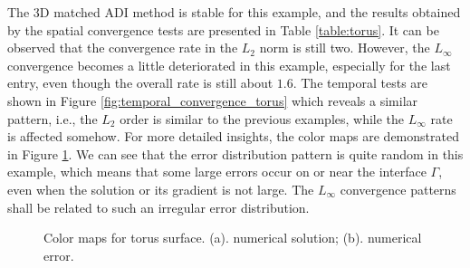 \documentclass[dissertation]{uathesis}
\begin{document}
\begin{body}
The 3D matched ADI method is stable for this example, and 
the results obtained by the spatial convergence tests are presented in Table \ref{table:torus}. It can be observed that the convergence rate in the $L_2$ norm is still two. However, the $L_{\infty}$ convergence becomes a little deteriorated in this example, especially for the last entry, even though the overall rate is still about $1.6$. 
The temporal tests are shown in Figure \ref{fig:temporal_convergence_torus} which reveals a similar pattern,  i.e., the $L_2$ order is similar to the previous examples, while the $L_{\infty}$ rate is affected somehow. 
For more detailed insights, the color maps are demonstrated in Figure \ref{fig:color_map_torus}. We can see that the error distribution pattern is quite random in this example, which means that  some large errors occur on or near the interface $\Gamma$, even when the solution or its gradient is not large. The $L_{\infty}$ convergence patterns shall be related to such an irregular error distribution. 

%
\begin{figure}[!ht]
	\begin{center}
	\end{center}
	\caption{Color maps for torus surface. (a). numerical solution;
		(b). numerical error.}
	\label{fig:color_map_torus}
\end{figure}


\end{body}
\end{document}
